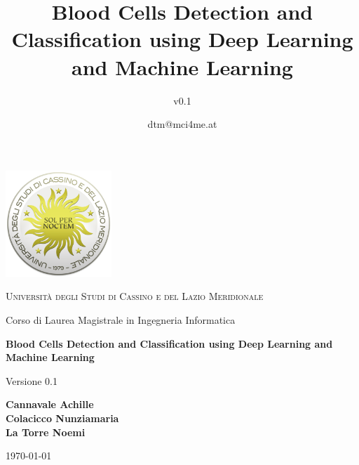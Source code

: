 \documentclass[minted, draw]{../tex/hebdomon}
\begin{document}
\title{Blood Cells Detection and Classification using Deep Learning and Machine Learning}
\author{v0.1}
\date{dtm@mci4me.at}



\begin{titlepage}
    \centering
	\includegraphics[width=4cm]{figures/logo.png}\par\vspace{1cm}


    {\scshape\LARGE Università degli Studi di Cassino e del Lazio Meridionale\par}
    \vspace{1cm}
    {\Large Corso di Laurea Magistrale in Ingegneria Informatica \par}

    \vspace{2cm}
    {\Huge\bfseries Blood Cells Detection and Classification using Deep Learning and Machine Learning\par}
    \vspace{1cm}
    {\large Versione 0.1}

    \vfill

    \begin{flushleft}
    \textbf{Cannavale Achille} \\
    \textbf{Colacicco Nunziamaria} \\
    \textbf{La Torre Noemi} \\
    \end{flushleft}

    \vspace{1.5cm}

    {\large \today\par}
\end{titlepage}

\dominitoc
\tableofcontents
\newpage

\Chapter{}
\end{document}
